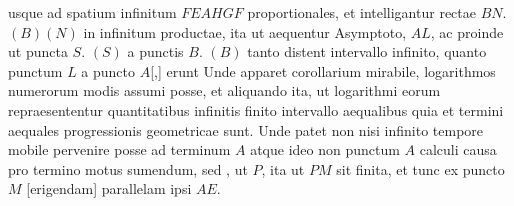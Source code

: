 usque ad spatium infinitum $\displaystyle FEAHGF$ proportionales,
et intelligantur rectae $\displaystyle BN.$ $\displaystyle (B)(N)$ in infinitum productae,
ita ut aequentur Asymptoto, $\displaystyle AL$,
ac proinde ut puncta $\displaystyle S.$ $\displaystyle (S)$ a punctis $\displaystyle B.$ $\displaystyle (B)$ tanto distent intervallo infinito,
quanto punctum $\displaystyle L$ a puncto $\displaystyle A$[,]
erunt 
Unde apparet corollarium mirabile, logarithmos numerorum
modis assumi posse, et aliquando ita,
ut logarithmi eorum repraesententur quantitatibus infinitis finito intervallo
aequalibus quia et termini aequales progressionis geometricae sunt.
Unde patet non nisi infinito tempore mobile pervenire posse ad terminum $\displaystyle A$
atque ideo non punctum $\displaystyle A$ calculi causa pro termino motus sumendum,
sed ,
ut $\displaystyle P$, ita ut $\displaystyle PM$ sit finita, et tunc ex puncto $\displaystyle M$ 
[erigendam]
parallelam ipsi $\displaystyle AE$.
